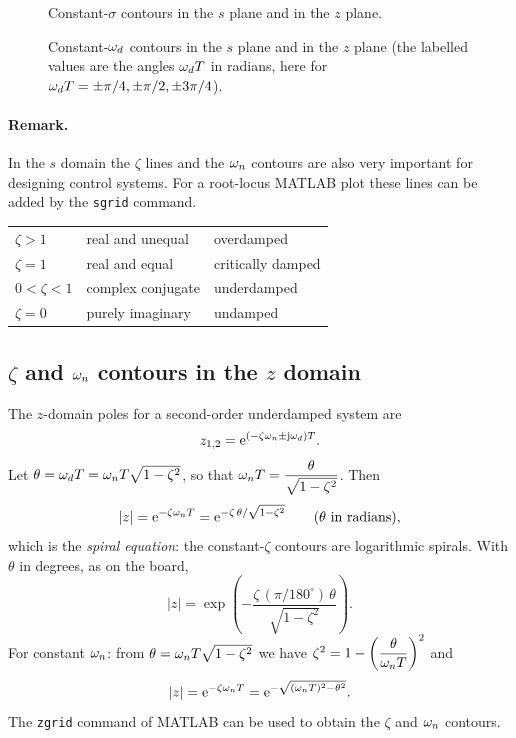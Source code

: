 \begin{figure}[H]
\centering
\resizebox{0.92\linewidth}{!}{\figSigmaContours}
\caption{Constant-$\sigma$ contours in the $s$ plane and in the $z$ plane.}
\end{figure}
\begin{figure}[H]
\centering
\resizebox{0.92\linewidth}{!}{\figWdContours}
\caption{Constant-$\omega_d$ contours in the $s$ plane and in the $z$ plane (the labelled values are the angles
$\omega_d T$ in radians, here for $\omega_d T=\pm\pi/4,\pm\pi/2,\pm3\pi/4$).}
\end{figure}

\paragraph{Remark.} In the $s$ domain the $\zeta$ lines and the $\omega_n$ contours are also very important for
designing control systems. For a root-locus MATLAB plot these lines can be added by the \texttt{sgrid} command.
\begin{center}
\renewcommand{\arraystretch}{1.3}
\begin{tabular}{@{}l l l@{}}
$\zeta>1$ & real and unequal & overdamped\\
$\zeta=1$ & real and equal & critically damped\\
$0<\zeta<1$ & complex conjugate & underdamped\\
$\zeta=0$ & purely imaginary & undamped
\end{tabular}
\end{center}

\subsection{$\zeta$ and $\omega_n$ contours in the $z$ domain}
The $z$-domain poles for a second-order underdamped system are
\[
  z_{1,2}=\mathrm{e}^{(-\zeta\omega_n\pm\mathrm{j}\omega_d)T}.
\]
Let $\theta=\omega_d T=\omega_n T\sqrt{1-\zeta^{2}}$, so that $\omega_n T=\dfrac{\theta}{\sqrt{1-\zeta^{2}}}$. Then
\[
  |z|=\mathrm{e}^{-\zeta\omega_n T}=\mathrm{e}^{-\zeta\,\theta/\sqrt{1-\zeta^{2}}}\qquad(\theta\ \text{in radians}),
\]
which is the \emph{spiral equation}: the constant-$\zeta$ contours are logarithmic spirals. With $\theta$ in
degrees, as on the board,
\begin{equation}
  |z|=\exp\!\left(-\frac{\zeta\,(\pi/180^{\circ})\,\theta}{\sqrt{1-\zeta^{2}}}\right).
\end{equation}
For constant $\omega_n$: from $\theta=\omega_n T\sqrt{1-\zeta^{2}}$ we have $\zeta^{2}=1-\left(\dfrac{\theta}{\omega_n T}\right)^{2}$ and
\begin{equation}
  |z|=\mathrm{e}^{-\zeta\omega_n T}=\mathrm{e}^{-\sqrt{(\omega_n T)^{2}-\theta^{2}}}.
\end{equation}
The \texttt{zgrid} command of MATLAB can be used to obtain the $\zeta$ and $\omega_n$ contours.

